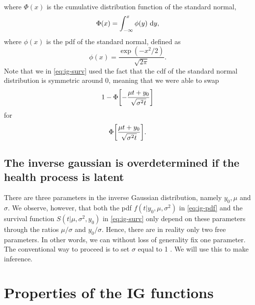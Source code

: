 where $\Phi(x)$ is the cumulative distribution function of the standard normal,
\begin{equation*}
    \Phi(x)=\int_{-\infty}^x\phi(y)\text{~d}y,
\end{equation*}
where $\phi(x)$ is the pdf of the standard normal, defined as
\begin{equation}
    \phi(x)=\frac{\exp\left(-x^2/2\right)}{\sqrt{2\pi}}.
\end{equation}
Note that we in \eqref{eq:ig-surv} used the fact that the cdf of the standard normal distribution is symmetric around 0,
meaning that we were able to swap
\begin{equation*}
    1-\Phi\sqb*{-\frac{\mu t+y_0}{\sqrt{\sigma^2t}}}
\end{equation*}
for
\begin{equation*}
    \Phi\sqb*{\frac{\mu t+y_0}{\sqrt{\sigma^2t}}}.
\end{equation*}

\subsection{The inverse gaussian is overdetermined if the health process is latent}
There are three parameters in the inverse Gaussian distribution, namely $y_0, \mu$ and $\sigma$.
We observe, however, that both the pdf $f(t|y_0,\mu,\sigma^2)$ in \eqref{eq:ig-pdf} and the survival function $S(t|\mu,\sigma^2,y_0)$ in \eqref{eq:ig-surv} only depend on these parameters through the ratios $\mu/\sigma$ and $y_0/\sigma$.
Hence, there are in reality only two free parameters. In other words, we can without loss of generality fix one parameter. The conventional way to proceed is to set $\sigma$ equal to 1 \citep{leewhitmore2006}. We will use this to make inference.

\section{Properties of the IG functions}

